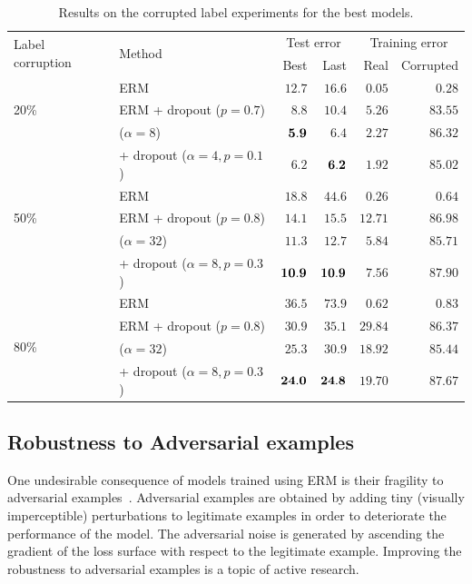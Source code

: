 \begin{table}
  \centering
  \begin{tabular}[b]{ll rr rr}
    \toprule
    \multirow{2}{*}{Label corruption} & \multirow{2}{*}{Method} & \multicolumn{2}{c}{Test error} & \multicolumn{2}{c}{Training error} \\
    \cmidrule(lr){3-4} \cmidrule(lr){5-6}
    \rule{0pt}{2ex} & & Best & Last & Real & Corrupted \\
    \midrule
    \multirow{3}{*}{20\%} & ERM & $12.7$ & $16.6$ & $0.05$ & $0.28$ \\
    & ERM + dropout ($p=0.7$) & $8.8$ & $10.4$ & $5.26$ & $83.55$ \\
     & \mixup{} ($\alpha=8$)& $\bf 5.9$ & $6.4$ & $2.27$ & $86.32$ \\
    & \mixup{} + dropout ($\alpha=4, p=0.1$) & $6.2$ & $\bf 6.2$ & $1.92$ & $85.02$ \\
    \midrule
    \multirow{3}{*}{50\%} & ERM & $18.8$ & $44.6$ & $0.26$ & $0.64$ \\
    & ERM + dropout ($p=0.8$)& $14.1$ & $15.5$ & $12.71$ & $86.98$ \\
    & \mixup{} ($\alpha=32$) & $11.3$ & $12.7$ & $5.84$ & $85.71$ \\
    & \mixup{} + dropout ($\alpha=8, p=0.3$) & $\bf 10.9$ & $\bf 10.9$ & $7.56$ & $87.90$ \\
    \midrule
    \multirow{4}{*}{80\%} & ERM & $36.5$ & $73.9$ & $0.62$ & $0.83$ \\
    & ERM + dropout ($p=0.8$)& $30.9$ & $35.1$ & $29.84$ & $86.37$ \\
    & \mixup{} ($\alpha=32$) & $25.3$ & $30.9$ & $18.92$ & $85.44$ \\
    & \mixup{} + dropout ($\alpha=8, p=0.3$) & $\bf 24.0$ & $\bf 24.8$ & $19.70$ & $87.67$ \\
    \bottomrule
  \end{tabular}
  \caption{Results on the corrupted label experiments for the best models.}
  \label{table:corrupt}
\end{table}

\subsection{Robustness to Adversarial examples}
\label{sec:adversarial}

One undesirable consequence of models trained using ERM is their fragility to
adversarial examples~\citep{SzegedyZSBEGF13}. Adversarial examples are obtained
by adding tiny (visually imperceptible) perturbations to legitimate examples in
order to deteriorate the performance of the model.  The adversarial noise is
generated by ascending the gradient of the loss surface with respect to the
legitimate example. Improving the robustness to adversarial examples is a topic
of active research.

